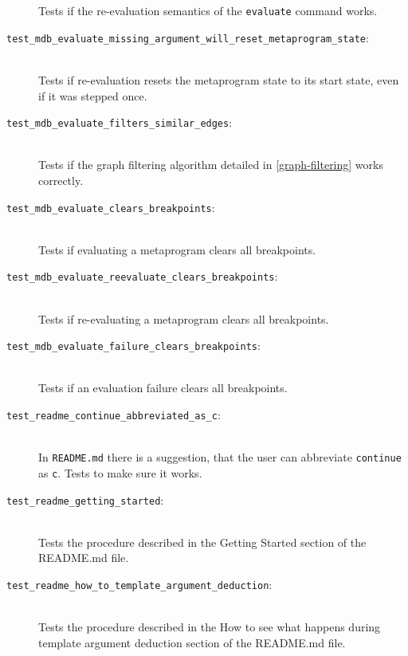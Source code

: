 \begin{description}
        Tests if the re-evaluation semantics of the \texttt{evaluate} command
        works.
    \item[\texttt{test\_mdb\_evaluate\_missing\_argument\_will\_reset\_metaprogram\_state}:] \hfill \\
        Tests if re-evaluation resets the metaprogram state to its start state,
        even if it was stepped once.
    \item[\texttt{test\_mdb\_evaluate\_filters\_similar\_edges}:] \hfill \\
        Tests if the graph filtering algorithm detailed in
        \ref{graph-filtering} works correctly.
    \item[\texttt{test\_mdb\_evaluate\_clears\_breakpoints}:] \hfill \\
        Tests if evaluating a metaprogram clears all breakpoints.
    \item[\texttt{test\_mdb\_evaluate\_reevaluate\_clears\_breakpoints}:] \hfill \\
        Tests if re-evaluating a metaprogram clears all breakpoints.
    \item[\texttt{test\_mdb\_evaluate\_failure\_clears\_breakpoints}:] \hfill \\
        Tests if an evaluation failure clears all breakpoints.
    \item[\texttt{test\_readme\_continue\_abbreviated\_as\_c}:] \hfill \\
        In \texttt{README.md} there is a suggestion, that the user can
        abbreviate \texttt{continue} as \texttt{c}. Tests to make sure it works.
    \item[\texttt{test\_readme\_getting\_started}:] \hfill \\
        Tests the procedure described in the Getting Started section of the
        README.md file.
    \item[\texttt{test\_readme\_how\_to\_template\_argument\_deduction}:] \hfill \\
        Tests the procedure described in the How to see what happens during
        template argument deduction section of the README.md file.
\end{description}

